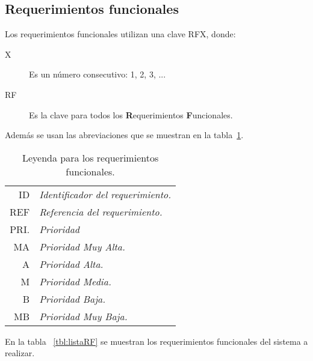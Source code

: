 \subsection{Requerimientos funcionales}
	Los requerimientos funcionales utilizan una clave RFX, donde:
        
\begin{description}
        \item[X] Es un número consecutivo: 1, 2, 3, ...
        \item[RF] Es la clave para todos los {\bf R}equerimientos {\bf F}uncionales.
\end{description}

	Además se usan las abreviaciones que se muestran en la tabla~\ref{tbl:leyendaRF}.
\begin{table}[hbtp!]
        \begin{center}
    \begin{tabular}{|r l|}
            \hline
        {\footnotesize ID} & {\footnotesize\em Identificador del requerimiento.}\\
        {\footnotesize REF} & {\footnotesize\em Referencia del requerimiento.}\\
        {\footnotesize PRI.} & {\footnotesize\em Prioridad}\\
        {\footnotesize MA} & {\footnotesize\em Prioridad Muy Alta.}\\
        {\footnotesize A} & {\footnotesize\em Prioridad Alta.}\\
        {\footnotesize M} & {\footnotesize\em Prioridad Media.}\\
        {\footnotesize B} & {\footnotesize\em Prioridad Baja.}\\
        {\footnotesize MB} & {\footnotesize\em Prioridad Muy Baja.}\\
                \hline
    \end{tabular} 
    \caption{Leyenda para los requerimientos funcionales.}
    \label{tbl:leyendaRF}
        \end{center}
\end{table}
En la tabla ~\ref{tbl:listaRF} se muestran los requerimientos funcionales del sistema a realizar.
